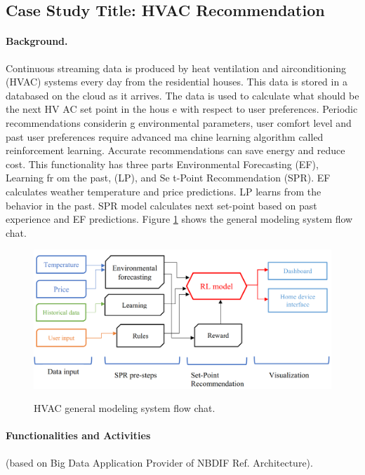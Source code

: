 \subsection{Case Study Title: HVAC Recommendation}


\paragraph*{Background.}

Continuous streaming data is produced by heat ventilation and airconditioning (HVAC) systems every
day from the residential houses. This data is stored in a databased on the cloud as it arrives. The data
is used to calculate what should be the next HV AC set point in the hous e with respect to user
preferences. Periodic recommendations considerin g environmental parameters, user comfort level
and past user preferences require advanced ma chine learning algorithm called reinforcement
learning. Accurate recommendations can save energy and reduce cost. This functionality has three
parts Environmental Forecasting (EF), Learning fr om the past, (LP), and Se t-Point Recommendation
(SPR). EF calculates weather temperature and price predictions. LP learns from the behavior in the
past. SPR model calculates next set-point based on past experience and EF predictions. Figure \ref{fig:hvac-1} shows
the general modeling system flow chat.

\begin{figure}[htb]
\includegraphics[width=1.0\textwidth]{usecase/hvac.png}
\label{fig:hvac-1}
\caption{HVAC general modeling system flow chat.}
\end{figure}



\paragraph*{Functionalities and Activities} (based on Big Data Application Provider of NBDIF Ref. Architecture).


